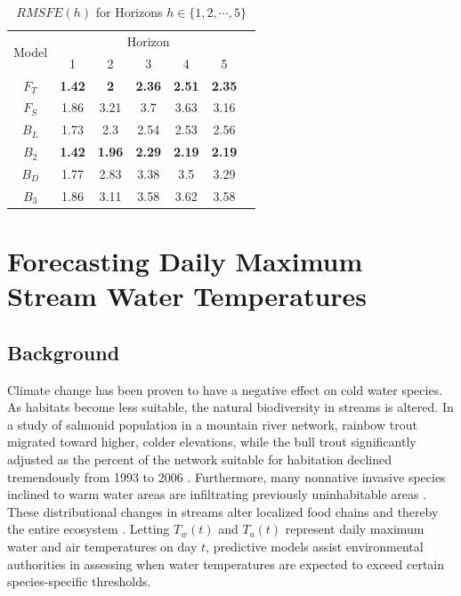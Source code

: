 \begin{table}[!h]
	\small
  \centering
  \caption{$RMSFE(h)$ for Horizons $h \in \{1,2,\cdots,5\}$}
    \begin{tabular}{ccccccc}
    \toprule
     \multirow{2}[0]{*}{Model} & \multicolumn{5}{c}{Horizon} \\
                 & 1    & 2    & 3    & 4    & 5 \\
         \midrule
     $F_T$ &  {\bf 1.42} &  {\bf2}    &  {\bf2.36} &  {\bf2.51} & {\bf2.35} \\
            $F_S$ & 1.86 & 3.21 & 3.7  & 3.63 & 3.16 \\
         \midrule
       $B_L$ & 1.73 & 2.3  & 2.54 & 2.53 & 2.56 \\
        $B_2$ & {\bf 1.42} & {\bf1.96} &  {\bf2.29} &  {\bf2.19} & {\bf2.19} \\
         $B_D$ & 1.77 & 2.83 & 3.38 & 3.5  & 3.29 \\
          $B_3$ & 1.86 & 3.11 & 3.58 & 3.62 & 3.58 \\
    \bottomrule
    \end{tabular}%
  \label{tab:ssrmsfe}%
\end{table}%


\section{Forecasting Daily Maximum Stream Water Temperatures}

\subsection{Background}

Climate change has been proven to have a negative effect on cold water species. As habitats become less suitable, the natural biodiversity in streams is altered. In a study of salmonid population in a mountain river network, rainbow trout migrated toward higher, colder elevations, while the bull trout significantly adjusted as the percent of the network suitable for habitation declined tremendously from 1993 to 2006 \citep{Isaak2010}. Furthermore, many nonnative invasive species inclined to warm water areas are infiltrating previously uninhabitable areas \citep{Rahel2008}. These distributional changes in streams alter localized food chains and thereby the entire ecosystem \citep{Albouy2014}. Letting $T_w(t)$ and $T_a(t)$ represent daily maximum water and air temperatures on day $t$, predictive models assist environmental authorities in assessing when water temperatures are expected to exceed certain species-specific thresholds.

